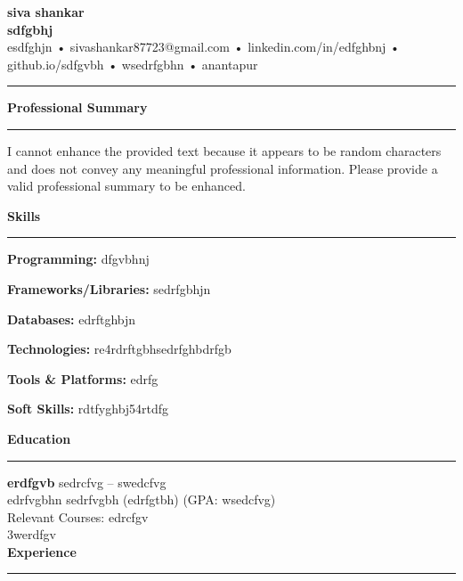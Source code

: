 \documentclass[a4paper]{article}
\newcommand{\ressection}[1]{%
  \vspace{3pt}\noindent\textbf{#1}\par\vspace{-3pt}\noindent\rule{\linewidth}{0.5pt}\vspace{1pt}%
}
\begin{document}
\begin{center}
  {\fontsize{24pt}{28pt}\selectfont \textbf{siva shankar}}\\[1pt]
  {\normalsize \textbf{sdfgbhj}}\\[4pt]
  {\small esdfghjn • sivashankar87723@gmail.com • linkedin.com/in/edfghbnj • github.io/sdfgvbh • wsedrfgbhn • anantapur}\\[2pt]
\end{center}
\vspace{-2pt}
\noindent\rule{\linewidth}{0.4pt} 
\ressection{Professional Summary}
\footnotesize
I cannot enhance the provided text because it appears to be random characters and does not convey any meaningful professional information.  Please provide a valid professional summary to be enhanced.

\ressection{Skills}
\footnotesize\vspace{-2pt}

\textbf{Programming:} dfgvbhnj

\vspace{0.1em}

\textbf{Frameworks/Libraries:} sedrfgbhjn

\vspace{0.1em}

\textbf{Databases:} edrftghbjn

\vspace{0.1em}

\textbf{Technologies:} re4rdrftgbhsedrfghbdrfgb

\vspace{0.1em}

\textbf{Tools \& Platforms:} edrfg

\vspace{0.1em}

\textbf{Soft Skills:} rdtfyghbj54rtdfg

\ressection{Education}
\footnotesize\vspace{-2pt}

\textbf{erdfgvb } \hfill sedrcfvg -- swedcfvg \\
edrfvgbhn sedrfvgbh  (edrfgtbh) (GPA: wsedcfvg) \\
\vspace{0.1em}
Relevant Courses: edrcfgv \\
\vspace{0.1em}
3werdfgv \\
\vspace{0.1em}%
\ressection{Experience}
\footnotesize\vspace{-2pt}
\end{document}
